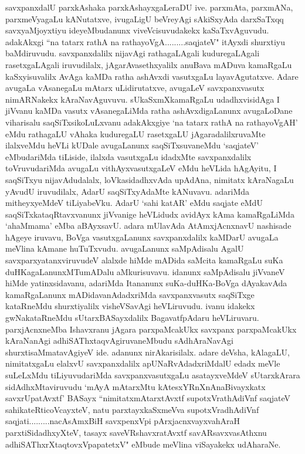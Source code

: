 \begin{artha}
savxpanxdalU parxkAshaka parxkAshayxgaLeraDU ive. parxmAta, parxmANa, parxmeVyagaLu kANutatxve, ivugaLigU beVreyAgi sAkiSxyAda darxSaTxqq savxyaMjoyxtiyu ideyeMbudanunx viveVcisuvudakekx kaSaTxvAguvudu. adakAkxgi ``na tatarx rathA na rathayoVgA.........saqjateV" itAyxdi shurxtiyu baMdiruvudu. savxpanxdalilx nijavAgi rathagaLAgali kuduregaLAgali rasetxgaLAgali iruvudilalx, jAgarAvasethxyalilx anuBava mADuva kamaRgaLu kaSxyisuvalilx AvAga kaMDa ratha ashAvxdi vasutxgaLu layavAgutatxve. Adare avugaLa vAsanegaLu mAtarx uLidirutatxve, avugaLeV savxpanxvasutx nimARNakekx kAraNavAguvuvu. sUkaSxmXkamaRgaLu udadhxvisidAga I jiVvanu kaMDa vasutx vAsanegaLiMda ratha ashAvxdigaLanunx avugaLoDane viharisalu saqSiTxsikoLuLxvanu adakAkxgiye `na tatarx rathA na rathayoVgAH' eMdu rathagaLU vAhaka kuduregaLU rasetxgaLU jAgaradalilxruvaMte ilalxveMdu heVLi kUDale avugaLanunx saqSiTxsuvaneMdu `saqjateV' eMbudariMda tiLiside, ilalxda vasutxgaLu idadxMte savxpanxdalilx toVruvudariMda avugaLu vithAyxvasutxgaLeV eMdu heVLida hAgAyitu, I saqSiTxyu nijavAdudalalx, loVkasidadhxvAda upAdAna, nimitatx kAraNagaLu yAvudU iruvudilalx, AdarU saqSiTxyAdaMte kANuvavu. adariMda mitheyxyeMdeV tiLiyabeVku. AdarU `sahi katAR' eMdu saqjate eMdU saqSiTxkataqRtavxvanunx jiVvanige heVLidudx avidAyx kAma kamaRgaLiMda `ahaMmama' eMba aBAyxsavU. adara mUlavAda AtAmxjAcnxnavU nashisade hAgeye iruvavu, BoVga vasutxgaLanunx savxpanxdalilx kaMDarU avugaLa meVlina kAmane huTuTxvudu. avugaLanunx saMpAdisalu AgalU savxparxyatanxviruvudeV alalxde hiMde mADida saMcita kamaRgaLu suKa duHKagaLanunxMTumADalu aMkurisuvavu. idanunx saMpAdisalu jiVvaneV hiMde yatinxsidavanu, adariMda Itananunx suKa-duHKa-BoVga dAyakavAda kamaRgaLanunx mADidavanAdadxriMda savxpanxvasutx saqSiTxge kataRneMdu shurxtiyalilx visheVSavAgi heVLiruvudu. ivanu idakekx gwNakataRneMdu sUtarxBASayxdalilx BagavatfpAdaru heVLiruvaru. parxjAcnxneMba Ishavxranu jAgara parxpaMcakUkx savxpanx parxpaMcakUkx kAraNanAgi adhiSAThxtaqvAgiruvaneMbudu sAdhAraNavAgi shurxtisaMmatavAgiyeV ide. adanunx nirAkarisilalx. adare deVsha, kAlagaLU, nimitatxgaLu elalxvU savxpanxdalilx apUNaRvAdadxriMdalU edadx meVle suLeLxMdu tiLiyuvudariMda savxpanxvasutxgaLu asatayxveMdeV sUtarxkArara sidAdhxMtaviruvudu `mAyA mAtarxMtu kAtesxYRnXnAnaBivayxkatx savxrUpatAvxtf' BASayx ``nimitatxmAtarxtAvxtf supotxVrathAdiVnf saqjateV sahikateRticoVcayxteV, natu parxtayxkaSxmeVva supotxVradhAdiVnf saqjati.........nacAsAmxBiH savxpenxV\s pi pArxjacnxvayxvahAraH parxtiSidadhxyXteV, tasayx saveVRshavxratAvxtf savARsavxvasAthxnu adhiSAThxrXtaqtovxVpapatetxV"  eMbude meVlina viSayakekx udAharaNe.
\end{artha}%

